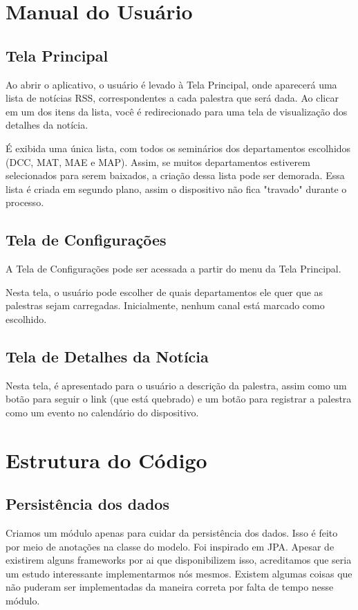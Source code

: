 




\cabecalho

\section{Manual do Usuário}
\subsection{Tela Principal}
Ao abrir o aplicativo, o usuário é levado à Tela Principal, onde aparecerá uma lista de notícias RSS, correspondentes a cada palestra que será dada. Ao clicar em um dos itens da lista, você é redirecionado para uma tela de visualização dos detalhes da notícia.

É exibida uma única lista, com todos os seminários dos departamentos escolhidos (DCC, MAT, MAE e MAP). Assim, se muitos departamentos estiverem selecionados para serem baixados, a criação dessa lista pode ser demorada. Essa lista é criada em segundo plano, assim o dispositivo não fica "travado" durante o processo.

\subsection{Tela de Configurações}
A Tela de Configurações pode ser acessada a partir do menu da Tela Principal.

Nesta tela, o usuário pode escolher de quais departamentos ele quer que as palestras sejam carregadas.
Inicialmente, nenhum canal está marcado como escolhido.

\subsection{Tela de Detalhes da Notícia}
Nesta tela, é apresentado para o usuário a descrição da palestra, assim como um botão para seguir o link (que está quebrado) e um botão para registrar a palestra como um evento no calendário do dispositivo.


\section{Estrutura do Código}
\subsection{Persistência dos dados}
Criamos um módulo apenas para cuidar da persistência dos dados. Isso é feito por meio de anotações na classe do modelo. Foi inspirado em JPA. Apesar de existirem alguns frameworks por ai que disponibilizem isso, acreditamos que seria um estudo interessante implementarmos nós mesmos. Existem algumas coisas que não puderam ser implementadas da maneira correta por falta de tempo nesse módulo.

